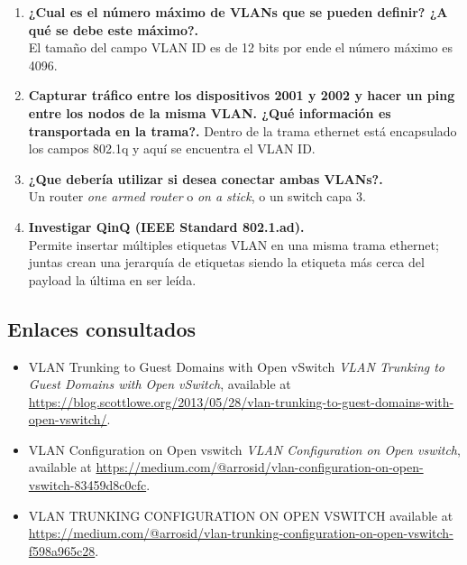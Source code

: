 \documentclass[letterpaper,12pt]{article}
\begin{document}
\begin{enumerate}
	\item \textbf{¿Cual es el número máximo de VLANs que se pueden definir? ¿A qué se debe este máximo?.} \\
	El tamaño del campo VLAN ID es de 12 bits por ende el número máximo es 4096. 
	\item \textbf{Capturar tráfico entre los dispositivos 2001 y 2002 y hacer un ping entre los nodos de la misma VLAN. ¿Qué información es transportada en la trama?.}
	Dentro de la trama ethernet está encapsulado los campos 802.1q y aquí se encuentra el VLAN ID.
	\item \textbf{¿Que debería utilizar si desea conectar ambas VLANs?.} \\
	Un router \textit{one armed router} o \textit{on a stick}, o un switch capa 3.
	\item \textbf{Investigar QinQ (IEEE Standard 802.1.ad).} \\
	Permite insertar múltiples etiquetas VLAN en una misma trama ethernet; juntas crean una jerarquía de etiquetas siendo la etiqueta más cerca del payload la última en ser leída.
\end{enumerate}
\subsection{Enlaces consultados}
\begin{itemize}
    \item{VLAN Trunking to Guest Domains with Open vSwitch} \emph{VLAN Trunking to Guest Domains with Open vSwitch},  available at \url{https://blog.scottlowe.org/2013/05/28/vlan-trunking-to-guest-domains-with-open-vswitch/}.
    
    \item{VLAN Configuration on Open vswitch} \emph{VLAN Configuration on Open vswitch}, available at \url{https://medium.com/@arrosid/vlan-configuration-on-open-vswitch-83459d8c0cfc}.
    
    \item{VLAN TRUNKING CONFIGURATION ON OPEN VSWITCH} available at \url{https://medium.com/@arrosid/vlan-trunking-configuration-on-open-vswitch-f598a965c28}.
\end{itemize}
\end{document}
